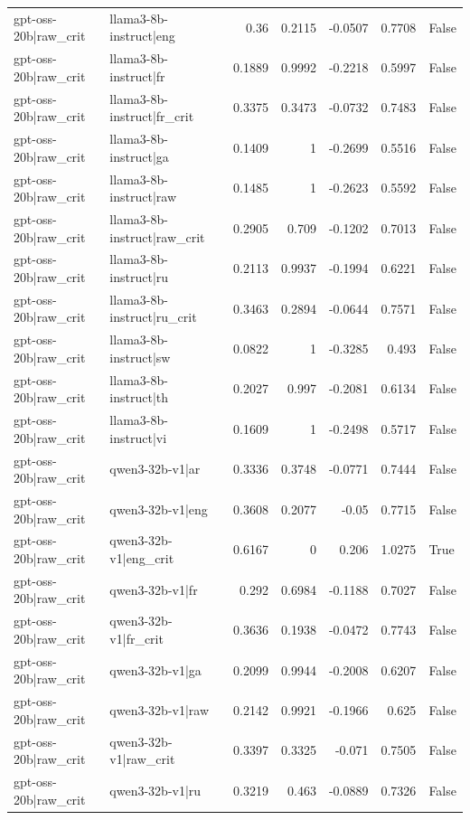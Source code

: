 \begin{table}
\begin{tabular}{l l r r r r l}
gpt-oss-20b|raw_crit & llama3-8b-instruct|eng & 0.36 & 0.2115 & -0.0507 & 0.7708 & False \\
gpt-oss-20b|raw_crit & llama3-8b-instruct|fr & 0.1889 & 0.9992 & -0.2218 & 0.5997 & False \\
gpt-oss-20b|raw_crit & llama3-8b-instruct|fr_crit & 0.3375 & 0.3473 & -0.0732 & 0.7483 & False \\
gpt-oss-20b|raw_crit & llama3-8b-instruct|ga & 0.1409 & 1 & -0.2699 & 0.5516 & False \\
gpt-oss-20b|raw_crit & llama3-8b-instruct|raw & 0.1485 & 1 & -0.2623 & 0.5592 & False \\
gpt-oss-20b|raw_crit & llama3-8b-instruct|raw_crit & 0.2905 & 0.709 & -0.1202 & 0.7013 & False \\
gpt-oss-20b|raw_crit & llama3-8b-instruct|ru & 0.2113 & 0.9937 & -0.1994 & 0.6221 & False \\
gpt-oss-20b|raw_crit & llama3-8b-instruct|ru_crit & 0.3463 & 0.2894 & -0.0644 & 0.7571 & False \\
gpt-oss-20b|raw_crit & llama3-8b-instruct|sw & 0.0822 & 1 & -0.3285 & 0.493 & False \\
gpt-oss-20b|raw_crit & llama3-8b-instruct|th & 0.2027 & 0.997 & -0.2081 & 0.6134 & False \\
gpt-oss-20b|raw_crit & llama3-8b-instruct|vi & 0.1609 & 1 & -0.2498 & 0.5717 & False \\
gpt-oss-20b|raw_crit & qwen3-32b-v1|ar & 0.3336 & 0.3748 & -0.0771 & 0.7444 & False \\
gpt-oss-20b|raw_crit & qwen3-32b-v1|eng & 0.3608 & 0.2077 & -0.05 & 0.7715 & False \\
gpt-oss-20b|raw_crit & qwen3-32b-v1|eng_crit & 0.6167 & 0 & 0.206 & 1.0275 & True \\
gpt-oss-20b|raw_crit & qwen3-32b-v1|fr & 0.292 & 0.6984 & -0.1188 & 0.7027 & False \\
gpt-oss-20b|raw_crit & qwen3-32b-v1|fr_crit & 0.3636 & 0.1938 & -0.0472 & 0.7743 & False \\
gpt-oss-20b|raw_crit & qwen3-32b-v1|ga & 0.2099 & 0.9944 & -0.2008 & 0.6207 & False \\
gpt-oss-20b|raw_crit & qwen3-32b-v1|raw & 0.2142 & 0.9921 & -0.1966 & 0.625 & False \\
gpt-oss-20b|raw_crit & qwen3-32b-v1|raw_crit & 0.3397 & 0.3325 & -0.071 & 0.7505 & False \\
gpt-oss-20b|raw_crit & qwen3-32b-v1|ru & 0.3219 & 0.463 & -0.0889 & 0.7326 & False \\

\end{tabular}
\end{table}
